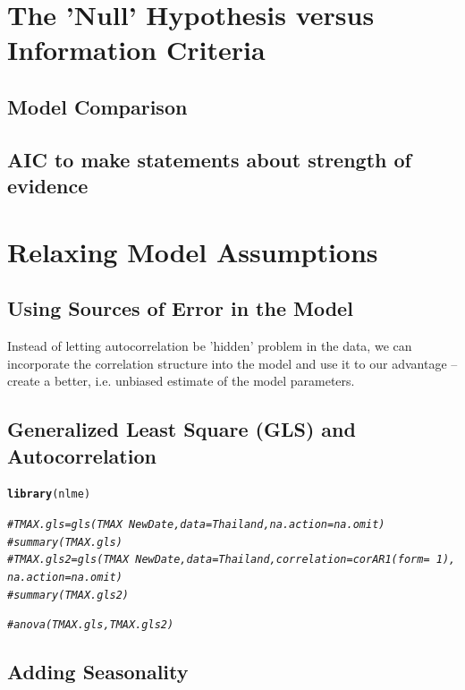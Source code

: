 \documentclass{article}\usepackage[]{graphicx}\usepackage[]{color}
\makeatletter
\newcommand{\hlcom}[1]{\textcolor[rgb]{0.678,0.584,0.686}{\textit{#1}}}%
\newcommand{\hlstd}[1]{\textcolor[rgb]{0.345,0.345,0.345}{#1}}%
\newcommand{\hlkwd}[1]{\textcolor[rgb]{0.737,0.353,0.396}{\textbf{#1}}}%
\newenvironment{kframe}{%
 \def\at@end@of@kframe{}%
 \ifinner\ifhmode%
  \def\at@end@of@kframe{\end{minipage}}%
  \begin{minipage}{\columnwidth}%
 \fi\fi%
 \def\FrameCommand##1{\hskip\@totalleftmargin \hskip-\fboxsep
 \colorbox{shadecolor}{##1}\hskip-\fboxsep
     \hskip-\linewidth \hskip-\@totalleftmargin \hskip\columnwidth}%
 \MakeFramed {\advance\hsize-\width
   \@totalleftmargin\z@ \linewidth\hsize
   \@setminipage}}%
 {\par\unskip\endMakeFramed%
 \at@end@of@kframe}
\newenvironment{knitrout}{}{} %
\makeatother
\begin{document}
\section{The 'Null' Hypothesis versus Information Criteria}

\subsection{Model Comparison}

\subsection{AIC to make statements about strength of evidence}


\section{Relaxing Model Assumptions}

\subsection{Using Sources of Error in the Model}

Instead of letting autocorrelation be 'hidden' problem in the data, we can incorporate the correlation structure into the model and use it to our advantage -- create a better, i.e. unbiased estimate of the model parameters.

\subsection{Generalized Least Square (GLS) and Autocorrelation}

\begin{knitrout}
\color{fgcolor}\begin{kframe}
\begin{alltt}
\hlkwd{library}\hlstd{(nlme)}

\hlcom{#TMAX.gls = gls(TMAX ~ NewDate, data = Thailand, na.action=na.omit)}
\hlcom{#summary(TMAX.gls)}
\hlcom{#TMAX.gls2 = gls(TMAX ~ NewDate, data = Thailand, correlation = corAR1(form=~1), na.action=na.omit)}
\hlcom{#summary(TMAX.gls2)}

\hlcom{#anova(TMAX.gls, TMAX.gls2)}
\end{alltt}
\end{kframe}
\end{knitrout}


\subsection{Adding Seasonality}
\end{document}
